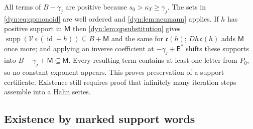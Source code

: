 \documentclass[11pt,letterpaper]{article}
\theoremstyle{definition}
\theoremstyle{remark}
\newcommand{\id}{\operatorname{id}}
\newcommand{\supp}{\operatorname{supp}}
\newcommand{\kups}{\kappa_{\Upsilon}}
\numberwithin{equation}{section}
\begin{document}
All terms of $B-\gamma_j$ are positive because $s_0>\kups\ge\gamma_j$. The
sets in \eqref{dyn:eq:qpmonoid} are well ordered and \cref{dyn:lem:neumann}
applies. If $h$ has positive support in $\mathsf M$ then
\cref{dyn:lem:qpsubstitution} gives
$\supp(\mathcal V\circ(\id+h))\subseteq B+\mathsf M$ and the same for
$\mathfrak c(h)$; $Dh\,\mathfrak c(h)$ adds $\mathsf M$ once more; and
applying an inverse coefficient at $-\gamma_j+\mathsf E^{*}$ shifts these
supports into $B-\gamma_j+\mathsf M\subseteq\mathsf M$. Every resulting
term contains at least one letter from $P_0$, so no constant exponent
appears. This proves preservation of a support certificate. Existence still
requires proof that infinitely many iteration steps assemble into a Hahn
series.

\subsection{Existence by marked support words}
\label{dyn:subsec:qpmarked}
\end{document}
